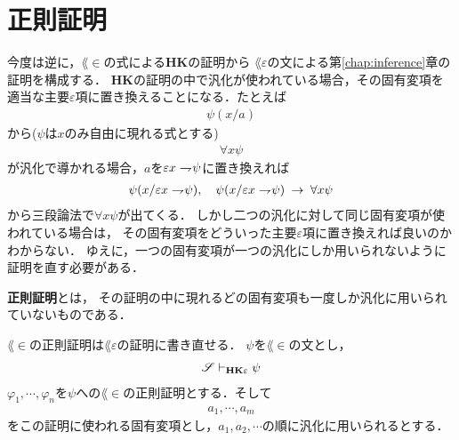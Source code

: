 \section{正則証明}
	今度は逆に，$\lang{\in}$の式による{\bf HK}の証明から
	$\lang{\varepsilon}$の文による第\ref{chap:inference}章の証明を構成する．
	{\bf HK}の証明の中で汎化が使われている場合，その固有変項を
	適当な主要$\varepsilon$項に置き換えることになる．たとえば
	\begin{align}
		\psi(x/a)
	\end{align}
	から($\psi$は$x$のみ自由に現れる式とする)
	\begin{align}
		\forall x \psi
	\end{align}
	が汎化で導かれる場合，$a$を$\varepsilon x \rightharpoondown\hspace{-0.25em} \psi$に置き換えれば
	\begin{align}
		\psi(x/\varepsilon x \rightharpoondown\hspace{-0.25em} \psi), 
		\quad \psi(x/\varepsilon x \rightharpoondown\hspace{-0.25em} \psi) \hspace{0.25em}\rightarrow\hspace{0.25em} \forall x \psi
	\end{align}
	から三段論法で$\forall x \psi$が出てくる．
	しかし二つの汎化に対して同じ固有変項が使われている場合は，
	その固有変項をどういった主要$\varepsilon$項に置き換えれば良いのかわからない．
	ゆえに，一つの固有変項が一つの汎化にしか用いられないように証明を直す必要がある．
	
	\begin{screen}
		\begin{metadfn}[正則証明]
			{\bf 正則証明}とは，
			その証明の中に現れるどの固有変項も一度しか汎化に用いられていないものである．
		\end{metadfn}
	\end{screen}
	
	\begin{screen}
		\begin{metathm}[どんな証明も正則化できる]
			
		\end{metathm}
	\end{screen}
	
	$\lang{\in}$の正則証明は$\lang{\varepsilon}$の証明に書き直せる．
	$\psi$を$\lang{\in}$の文とし，
	\begin{align}
		\mathscr{S} \vdash_{{\scriptsize \mbox{{\bf HK$\varepsilon$}}}} \psi
	\end{align}
	$\varphi_{1},\cdots,\varphi_{n}$を$\psi$への$\lang{\in}$の正則証明とする．そして
	\begin{align}
		a_{1},\cdots,a_{m}
	\end{align}
	をこの証明に使われる固有変項とし，$a_{1},a_{2},\cdots$の順に汎化に用いられるとする．
	
